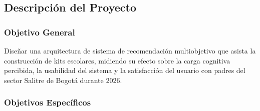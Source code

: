 \subsection{Descripción del Proyecto}

\subsubsection{Objetivo General}

Diseñar una arquitectura de sistema de recomendación multiobjetivo que asista la
construcción de kits escolares, midiendo su efecto sobre la carga cognitiva percibida, la
usabilidad del sistema y la satisfacción del usuario con padres del sector Salitre de
Bogotá durante 2026.


\subsubsection{Objetivos Específicos}
\label{sec:objetivos}

